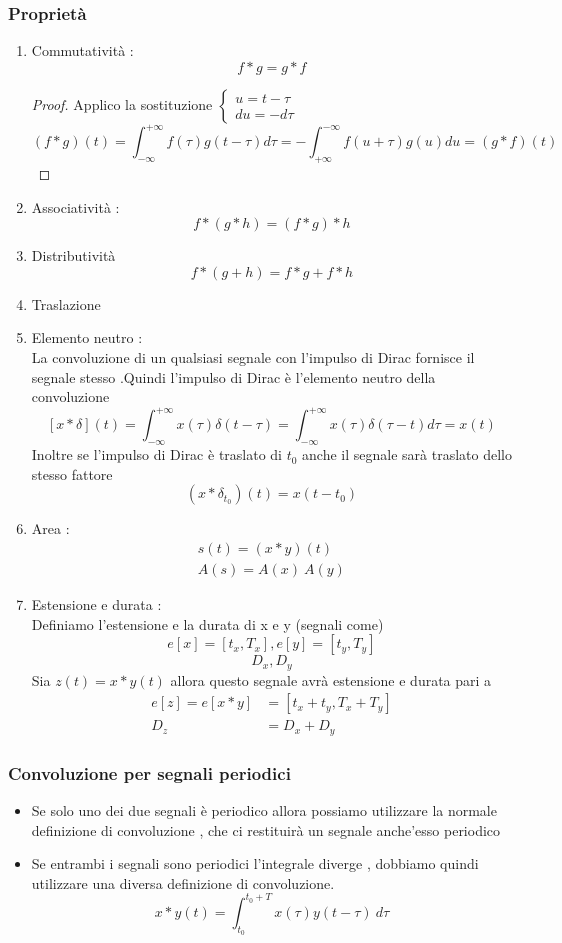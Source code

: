 \documentclass{article}
\theoremstyle{definition}
\newcommand{\intinf}{\int_{-\infty}^{+\infty}}
\begin{document}
\subsubsection{Proprietà}
\begin{enumerate}
	\item Commutatività : \\
	$$f*g=g*f$$
	\begin{proof}
		Applico la sostituzione $\begin{cases}
			u=t-\tau\\
			du=-d\tau
 		\end{cases}$
		$$(f*g)(t)=\intinf f(\tau)g(t-\tau)d\tau= -\int_{+\infty}^{-\infty}f(u+\tau)g(u)du=(g*f)(t)$$
	\end{proof}
	\item Associatività : \\
	$$f * (g*h)=(f*g)*h$$
	\item Distributività
	$$f*(g+h)=f*g+f*h$$
	\item Traslazione
	\item Elemento neutro : \\
	La convoluzione di un qualsiasi segnale con l'impulso di Dirac fornisce il segnale stesso .Quindi l'impulso di Dirac è l'elemento neutro della convoluzione 
	$$\left[x*\delta\right](t)=\intinf x(\tau)\delta(t-\tau)=\intinf x(\tau)\delta(\tau-t)d\tau=x(t)$$
	Inoltre se l'impulso di Dirac è traslato di $t_0$ anche il segnale sarà traslato dello stesso fattore 
	$$(x*\delta_{t_0})(t)=x(t-t_0)$$
	\item Area : \\
	\begin{align*}
		s(t)=(x*y)(t) \\
		A(s)=A(x) \ A(y)
	\end{align*}
	\item Estensione e durata :\\
	Definiamo l'estensione  e la durata di x e y (segnali come) $$e\left[x\right]=\left[t_x,T_x\right] , e\left[y\right]=\left[t_y,T_y\right] $$ $$D_x,D_y$$
	Sia $z(t)=x*y(t)$  allora questo segnale avrà estensione e durata pari a 
	\begin{align*}
		e\left[z\right]=e [x*y] &= [t_x+t_y,T_x+T_y ]\\
		D_z&=D_x+D_y
	\end{align*}
\end{enumerate}
\subsubsection{Convoluzione per segnali periodici}
\begin{itemize}
	\item Se solo uno dei due segnali è periodico allora possiamo utilizzare la normale definizione di convoluzione , che ci restituirà un segnale anche'esso periodico 
	\item Se entrambi i segnali sono periodici l'integrale diverge , dobbiamo quindi utilizzare una diversa definizione di convoluzione. 
	$$x*y(t)=\int_{t_0}^{t_0+T}x(\tau)y(t-\tau) \ d\tau$$
\end{itemize}
\end{document}
